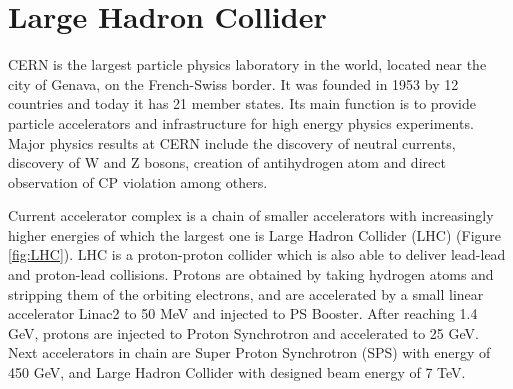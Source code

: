 \chapter{Large Hadron Collider} %

\label{Chapter3} %


CERN is the largest particle physics laboratory in the world, located near the city of Genava, on the French-Swiss border. It was founded in 1953 by 12 countries and today it has 21 member states. Its main function is to provide particle accelerators and infrastructure for high energy physics experiments. Major physics results at CERN include the discovery of neutral currents, discovery of W and Z bosons, creation of antihydrogen atom and direct observation of CP violation among others.
\par Current accelerator complex is a chain of smaller accelerators with increasingly higher energies of which the largest one is Large Hadron Collider (LHC) (Figure \ref{fig:LHC}). LHC is a proton-proton collider which is also able to deliver lead-lead and proton-lead collisions. Protons are obtained by taking hydrogen atoms and stripping them of the orbiting electrons, and are accelerated by a small linear accelerator Linac2 to 50 MeV and injected to PS Booster. After reaching 1.4 GeV, protons are injected to Proton Synchrotron and accelerated to 25 GeV. Next accelerators in chain are Super Proton Synchrotron (SPS) with energy of 450 GeV, and Large Hadron Collider with designed beam energy of 7 TeV. 
 
